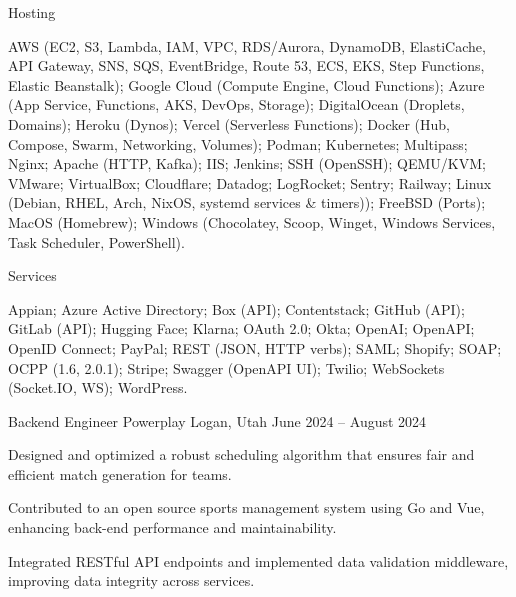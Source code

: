 \documentclass[10pt, a4paper]{russell}
\begin{document}
\begin{cvskills}
    \cvskill
        {Hosting}
        {\parbox[t]{0.99\linewidth}{
            AWS (EC2, S3, Lambda, IAM, VPC, RDS/Aurora, DynamoDB, ElastiCache, API Gateway, SNS, SQS, EventBridge, Route 53, ECS, EKS, Step Functions, Elastic Beanstalk);  
            Google Cloud (Compute Engine, Cloud Functions);  
            Azure (App Service, Functions, AKS, DevOps, Storage);  
            DigitalOcean (Droplets, Domains);  
            Heroku (Dynos);  
            Vercel (Serverless Functions);  
            Docker (Hub, Compose, Swarm, Networking, Volumes);
            Podman;
            Kubernetes;
            Multipass;
            Nginx;  
            Apache (HTTP, Kafka);  
            IIS;  
            Jenkins;  
            SSH (OpenSSH);  
            QEMU/KVM;  
            VMware;  
            VirtualBox;  
            Cloudflare;  
            Datadog;  
            LogRocket;  
            Sentry; 
            Railway;
            Linux (Debian, RHEL, Arch, NixOS, systemd services \& timers));  
            FreeBSD (Ports);  
            MacOS (Homebrew);  
            Windows (Chocolatey, Scoop, Winget, Windows Services, Task Scheduler, PowerShell).
        }}
    
    \cvskill
        {Services}
        {\parbox[t]{0.99\linewidth}{
            Appian;  
            Azure Active Directory;  
            Box (API);  
            Contentstack;  
            GitHub (API);  
            GitLab (API);  
            Hugging Face;  
            Klarna;  
            OAuth 2.0;  
            Okta;  
            OpenAI;  
            OpenAPI;  
            OpenID Connect;  
            PayPal;  
            REST (JSON, HTTP verbs);  
            SAML;  
            Shopify;  
            SOAP;  
            OCPP (1.6, 2.0.1);
            Stripe;  
            Swagger (OpenAPI UI);  
            Twilio;  
            WebSockets (Socket.IO, WS);  
            WordPress.
        }}
    
\end{cvskills}

\begin{cventries}

    \cventry
        {Backend Engineer}
        {Powerplay}
        {Logan, Utah}
        {June 2024 – August 2024}
        {
            \begin{cvitems}
                \item Designed and optimized a robust scheduling algorithm that ensures fair and efficient match generation for teams.
                \item Contributed to an open source sports management system using Go and Vue, enhancing back-end performance and maintainability.
                \item Integrated RESTful API endpoints and implemented data validation middleware, improving data integrity across services.
            \end{cvitems}
        }

\end{cventries}
\end{document}
